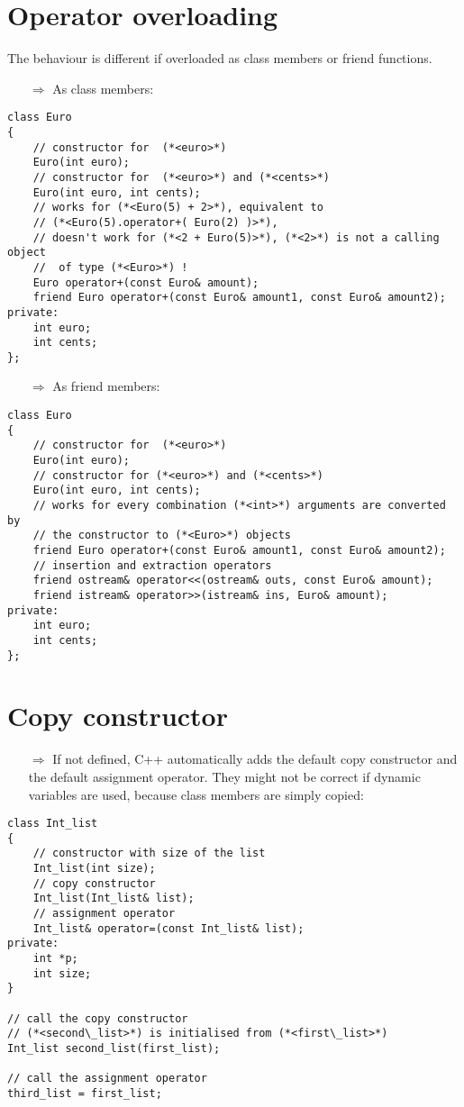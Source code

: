 \documentclass[10pt]{article}
\begin{document}
\section{Operator overloading}
\small
The behaviour is different if overloaded as class members or 
friend functions.
\begin{enumerate}
\item[$\Rightarrow$] As class members:
\end{enumerate}
\begin{lstlisting}
class Euro
{
    // constructor for  (*<euro>*)
    Euro(int euro);
    // constructor for  (*<euro>*) and (*<cents>*)
    Euro(int euro, int cents);
    // works for (*<Euro(5) + 2>*), equivalent to 
    // (*<Euro(5).operator+( Euro(2) )>*),
    // doesn't work for (*<2 + Euro(5)>*), (*<2>*) is not a calling object
    //  of type (*<Euro>*) !
    Euro operator+(const Euro& amount); 
    friend Euro operator+(const Euro& amount1, const Euro& amount2);
private:
    int euro;
    int cents;
};
\end{lstlisting}
\begin{enumerate}
\item[$\Rightarrow$] As friend members:
\end{enumerate}
\begin{lstlisting}
class Euro
{
    // constructor for  (*<euro>*)
    Euro(int euro);
    // constructor for (*<euro>*) and (*<cents>*)
    Euro(int euro, int cents);
    // works for every combination (*<int>*) arguments are converted by 
    // the constructor to (*<Euro>*) objects
    friend Euro operator+(const Euro& amount1, const Euro& amount2);
    // insertion and extraction operators
    friend ostream& operator<<(ostream& outs, const Euro& amount);
    friend istream& operator>>(istream& ins, Euro& amount);
private:
    int euro;
    int cents;
};
\end{lstlisting}
%
%
\section{Copy constructor}
\small
\begin{enumerate}
\item[$\Rightarrow$] If not defined, C++ automatically adds the default copy
constructor and the default assignment operator.
They might not be correct if dynamic variables are used,
because class members are simply copied:
\end{enumerate}
\begin{lstlisting}
class Int_list
{
    // constructor with size of the list
    Int_list(int size);
    // copy constructor
    Int_list(Int_list& list);
    // assignment operator
    Int_list& operator=(const Int_list& list);
private:
    int *p;
    int size;
}

// call the copy constructor
// (*<second\_list>*) is initialised from (*<first\_list>*)
Int_list second_list(first_list); 

// call the assignment operator
third_list = first_list;
\end{lstlisting}
%
%
\end{document}
